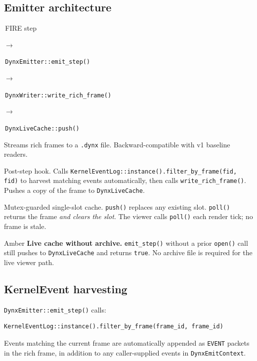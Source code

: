 ﻿\documentclass[11pt,a4paper]{article}
\newcommand{\pipenode}[1]{%
  \colorbox{GrayLight}{\strut\,\footnotesize#1\,}}
\newcommand{\pipearrow}{\;\textcolor{GrayMid}{$\to$}\;}
\begin{document}
\subsection*{Emitter architecture}

\medskip\noindent
\pipenode{FIRE step}
\pipearrow\pipenode{\texttt{DynxEmitter::emit\_step()}}
\pipearrow\pipenode{\texttt{DynxWriter::write\_rich\_frame()}}
\par\noindent\hspace{6em}\pipearrow\pipenode{\texttt{DynxLiveCache::push()}}
\medskip

\begin{description}[leftmargin=*,itemsep=3pt]
  \item[\texttt{DynxWriter}] Streams rich frames to a \texttt{.dynx} file.
    Backward-compatible with v1 baseline readers.
  \item[\texttt{DynxEmitter}] Post-step hook.  Calls
    \texttt{KernelEventLog::instance().filter\_by\_frame(fid, fid)} to harvest
    matching events automatically, then calls \texttt{write\_rich\_frame()}.
    Pushes a copy of the frame to \texttt{DynxLiveCache}.
  \item[\texttt{DynxLiveCache}] Mutex-guarded single-slot cache.  \texttt{push()} replaces
    any existing slot.  \texttt{poll()} returns the frame \emph{and clears the slot}.
    The viewer calls \texttt{poll()} each render tick; no frame is stale.
\end{description}

\begin{notebox}{Amber}
\textbf{Live cache without archive.}
\texttt{emit\_step()} without a prior \texttt{open()} call still pushes to
\texttt{DynxLiveCache} and returns \texttt{true}.  No archive file is required
for the live viewer path.
\end{notebox}

\subsection*{KernelEvent harvesting}

\texttt{DynxEmitter::emit\_step()} calls:

\begin{lstlisting}
KernelEventLog::instance().filter_by_frame(frame_id, frame_id)
\end{lstlisting}

Events matching the current frame are automatically appended as \texttt{EVENT} packets
in the rich frame, in addition to any caller-supplied events in \texttt{DynxEmitContext}.
\end{document}
